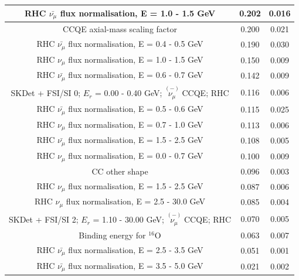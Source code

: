 \begin{table}
\begin{tabular}{| c | c | c |}
                               RHC $\bar{\nu_\mu}$ flux normalisation, E = 1.0 - 1.5 GeV & 0.202 & 0.016 \\ \hline 
                                                          CCQE axial-mass scaling factor & 0.200 & 0.021 \\ \hline 
                               RHC $\bar{\nu_\mu}$ flux normalisation, E = 0.4 - 0.5 GeV & 0.190 & 0.030 \\ \hline 
                                     RHC $\nu_\mu$ flux normalisation, E = 1.0 - 1.5 GeV & 0.150 & 0.009 \\ \hline 
                               RHC $\bar{\nu_\mu}$ flux normalisation, E = 0.6 - 0.7 GeV & 0.142 & 0.009 \\ \hline 
         SKDet + FSI/SI  0; $E_r$ =  0.00 - 0.40 GeV; $\overset{(-)}{\nu_\mu}$ CCQE; RHC & 0.116 & 0.006 \\ \hline 
                               RHC $\bar{\nu_\mu}$ flux normalisation, E = 0.5 - 0.6 GeV & 0.115 & 0.025 \\ \hline 
                                     RHC $\nu_\mu$ flux normalisation, E = 0.7 - 1.0 GeV & 0.113 & 0.006 \\ \hline 
                               RHC $\bar{\nu_\mu}$ flux normalisation, E = 1.5 - 2.5 GeV & 0.108 & 0.005 \\ \hline 
                                     RHC $\nu_\mu$ flux normalisation, E = 0.0 - 0.7 GeV & 0.100 & 0.009 \\ \hline 
                                                                          CC other shape & 0.096 & 0.003 \\ \hline 
                                     RHC $\nu_\mu$ flux normalisation, E = 1.5 - 2.5 GeV & 0.087 & 0.006 \\ \hline 
                                    RHC $\nu_\mu$ flux normalisation, E = 2.5 - 30.0 GeV & 0.085 & 0.004 \\ \hline 
        SKDet + FSI/SI  2; $E_r$ =  1.10 - 30.00 GeV; $\overset{(-)}{\nu_\mu}$ CCQE; RHC & 0.070 & 0.005 \\ \hline 
                                                             Binding energy for $^{16}$O & 0.063 & 0.007 \\ \hline 
                               RHC $\bar{\nu_\mu}$ flux normalisation, E = 2.5 - 3.5 GeV & 0.051 & 0.001 \\ \hline 
                               RHC $\bar{\nu_\mu}$ flux normalisation, E = 3.5 - 5.0 GeV & 0.021 & 0.002 \\ \hline 

\end{tabular}
\end{table}
